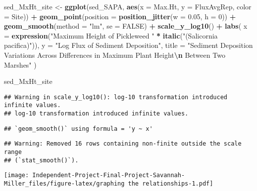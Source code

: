 \documentclass[
]{article}
\newenvironment{Shaded}{\begin{snugshade}}{\end{snugshade}}
\newcommand{\AttributeTok}[1]{\textcolor[rgb]{0.13,0.29,0.53}{#1}}
\newcommand{\ConstantTok}[1]{\textcolor[rgb]{0.56,0.35,0.01}{#1}}
\newcommand{\DecValTok}[1]{\textcolor[rgb]{0.00,0.00,0.81}{#1}}
\newcommand{\FloatTok}[1]{\textcolor[rgb]{0.00,0.00,0.81}{#1}}
\newcommand{\FunctionTok}[1]{\textcolor[rgb]{0.13,0.29,0.53}{\textbf{#1}}}
\newcommand{\NormalTok}[1]{#1}
\newcommand{\OtherTok}[1]{\textcolor[rgb]{0.56,0.35,0.01}{#1}}
\newcommand{\SpecialCharTok}[1]{\textcolor[rgb]{0.81,0.36,0.00}{\textbf{#1}}}
\newcommand{\StringTok}[1]{\textcolor[rgb]{0.31,0.60,0.02}{#1}}
\begin{document}
\begin{Shaded}
\begin{Highlighting}[]
\NormalTok{sed\_MxHt\_site }\OtherTok{\textless{}{-}} \FunctionTok{ggplot}\NormalTok{(sed\_SAPA, }\FunctionTok{aes}\NormalTok{(}\AttributeTok{x =}\NormalTok{ Max.Ht, }\AttributeTok{y =}\NormalTok{ FluxAvgRep, }\AttributeTok{color =}\NormalTok{ Site)) }\SpecialCharTok{+}
  \FunctionTok{geom\_point}\NormalTok{(}\AttributeTok{position =} \FunctionTok{position\_jitter}\NormalTok{(}\AttributeTok{w =} \FloatTok{0.05}\NormalTok{, }\AttributeTok{h =} \DecValTok{0}\NormalTok{)) }\SpecialCharTok{+}
  \FunctionTok{geom\_smooth}\NormalTok{(}\AttributeTok{method =} \StringTok{"lm"}\NormalTok{, }\AttributeTok{se =} \ConstantTok{FALSE}\NormalTok{) }\SpecialCharTok{+}
  \FunctionTok{scale\_y\_log10}\NormalTok{() }\SpecialCharTok{+}
  \FunctionTok{labs}\NormalTok{(}
    \AttributeTok{x =} \FunctionTok{expression}\NormalTok{(}\StringTok{"Maximum Height of Pickleweed "} \SpecialCharTok{*} \FunctionTok{italic}\NormalTok{(}\StringTok{"(Salicornia pacifica)"}\NormalTok{)),}
    \AttributeTok{y =} \StringTok{"Log Flux of Sediment Deposition"}\NormalTok{,}
    \AttributeTok{title =} \StringTok{"Sediment Deposition Variations Across Differences in Maximum Plant Height}\SpecialCharTok{\textbackslash{}n}\StringTok{ Between Two Marshes"}
\NormalTok{  )}

\NormalTok{sed\_MxHt\_site}
\end{Highlighting}
\end{Shaded}

\begin{verbatim}
## Warning in scale_y_log10(): log-10 transformation introduced infinite values.
## log-10 transformation introduced infinite values.
\end{verbatim}

\begin{verbatim}
## `geom_smooth()` using formula = 'y ~ x'
\end{verbatim}

\begin{verbatim}
## Warning: Removed 16 rows containing non-finite outside the scale range
## (`stat_smooth()`).
\end{verbatim}

\texttt{[image: Independent-Project-Final-Project-Savannah-Miller\_files/figure-latex/graphing the relationships-1.pdf]}
\end{document}
